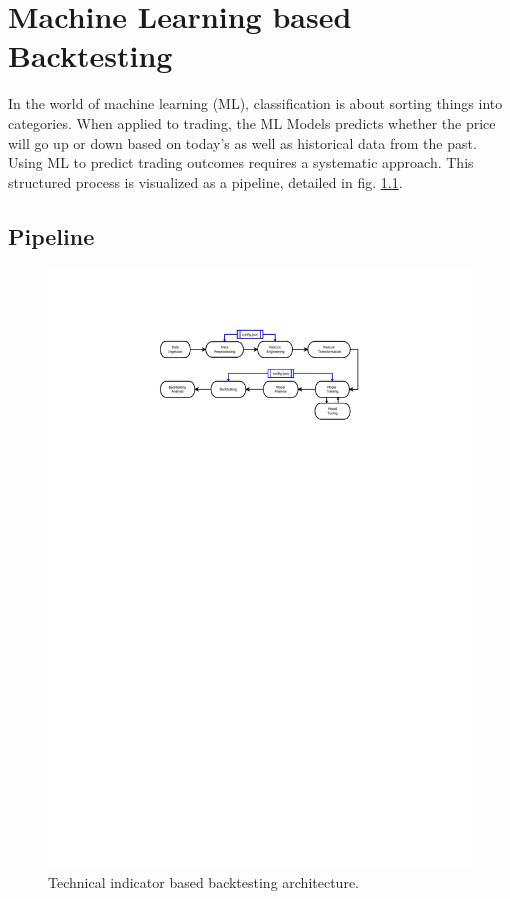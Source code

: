 \chapter{Machine Learning based Backtesting}

In the world of machine learning (ML), classification is about sorting things into categories. When applied to trading,
the ML Models predicts whether the price will go up or down based on today's as well as historical data from the past.
Using ML to predict trading outcomes requires a systematic approach.
This structured process is visualized as a pipeline, detailed in fig. \ref{fig:ml_pipeline}.

\section{Pipeline}


\begin{figure}[H]
\centering
\includegraphics[trim=25mm 220mm 55mm 30mm, width=1.2\textwidth, clip]{./pdf/ml_pipeline.pdf}
\caption{Technical indicator based backtesting architecture.}
\label{fig:ml_pipeline}
\end{figure}

